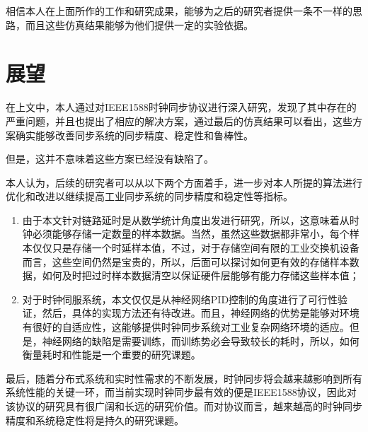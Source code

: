 相信本人在上面所作的工作和研究成果，能够为之后的研究者提供一条不一样的思路，而且这些仿真结果能够为他们提供一定的实验依据。 

\section{展望}
在上文中，本人通过对IEEE1588时钟同步协议进行深入研究，发现了其中存在的严重问题，并且也提出了相应的解决方案，通过最后的仿真结果可以看出，这些方案确实能够改善同步系统的同步精度、稳定性和鲁棒性。

但是，这并不意味着这些方案已经没有缺陷了。

本人认为，后续的研究者可以从以下两个方面着手，进一步对本人所提的算法进行优化和改进以继续提高工业同步系统的同步精度和稳定性等指标。
\begin{enumerate}[noitemsep,topsep=0pt,parsep=0pt,partopsep=0pt]
	\item 由于本文针对链路延时是从数学统计角度出发进行研究，所以，这意味着从时钟必须能够存储一定数量的样本数据。当然，虽然这些数据都非常小，每个样本仅仅只是存储一个时延样本值，不过，对于存储空间有限的工业交换机设备而言，这些空间仍然是宝贵的，所以，后面可以探讨如何更有效的存储样本数据，如何及时把过时样本数据清空以保证硬件层能够有能力存储这些样本值；
	\item 对于时钟伺服系统，本文仅仅是从神经网络PID控制的角度进行了可行性验证，然后，具体的实现方法还有待改进。而且，神经网络的优势是能够对环境有很好的自适应性，这能够提供时钟同步系统对工业复杂网络环境的适应。但是，神经网络的缺陷是需要训练，而训练势必会导致较长的耗时，所以，如何衡量耗时和性能是一个重要的研究课题。
\end{enumerate}

最后，随着分布式系统和实时性需求的不断发展，时钟同步将会越来越影响到所有系统性能的关键一环，而当前实现时钟同步最有效的便是IEEE1588协议，因此对该协议的研究具有很广阔和长远的研究价值。而对协议而言，越来越高的时钟同步精度和系统稳定性将是持久的研究课题。